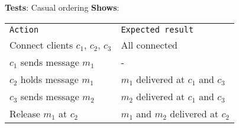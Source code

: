 



	


	\textbf{Tests}: Casual ordering
	\textbf{Shows}: 

	\begin{tabular}{ll}
		\texttt{Action} & \texttt{Expected result} \\
		Connect clients $c_1$, $c_2$, $c_3$ & All connected\\
		$c_1$ sends message $m_1$ & -\\
		$c_2$ holds message $m_1$ & $m_1$ delivered at $c_1$ and $c_3$ \\
		$c_3$ sends message $m_2$ & $m_2$ delivered at $c_1$ and $c_3$ \\
		Release $m_1$ at $c_2$ & $m_1$ and $m_2$ delivered at $c_2$ \\
	\end{tabular}


